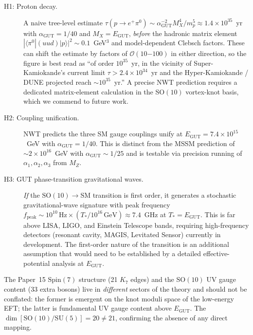 \documentclass[11pt]{article}
\begin{document}
\begin{description}
\item[H1: Proton decay.] A naive tree-level estimate
$\tau(p \to e^+ \pi^0)
\sim \alpha_\text{GUT}^{-2} M_X^4 / m_p^5
\approx 1.4 \times 10^{35}$~yr
with $\alpha_\text{GUT} = 1/40$ and $M_X = E_\text{GUT}$,
\emph{before} the hadronic matrix element
$|\langle \pi^0 | (uud) | p \rangle|^2 \sim 0.1$~GeV$^3$ and
model-dependent Clebsch factors.  These can shift the estimate by
factors of $\mathcal{O}(10\mathrm{-}100)$ in either direction, so
the figure is best read as ``of order $10^{35}$~yr, in the vicinity
of Super-Kamiokande's current limit $\tau > 2.4 \times
10^{34}$~yr and the Hyper-Kamiokande / DUNE projected reach
$\sim 10^{35}$~yr.''  A precise NWT prediction requires a
dedicated matrix-element calculation in the $\mathrm{SO}(10)$
vortex-knot basis, which we commend to future work.

\item[H2: Coupling unification.]
NWT predicts the three SM gauge couplings unify at $E_\text{GUT}
= 7.4 \times 10^{15}$~GeV with $\alpha_\text{GUT} = 1/40$.
This is distinct from the MSSM prediction of $\sim 2 \times
10^{16}$~GeV with $\alpha_\text{GUT} \sim 1/25$ and is testable
via precision running of $\alpha_1, \alpha_2, \alpha_3$ from $M_Z$.

\item[H3: GUT phase-transition gravitational waves.]
\emph{If} the $\mathrm{SO}(10) \to \text{SM}$ transition is first
order, it generates a stochastic gravitational-wave signature with
peak frequency
$f_\text{peak} \sim 10^{10}\,\text{Hz} \times (T_*/10^{16}\,\text{GeV})
\approx 7.4$~GHz
at $T_* = E_\text{GUT}$.  This is far above LISA, LIGO, and
Einstein Telescope bands, requiring high-frequency detectors
(resonant cavity, MAGIS, Levitated Sensor) currently in
development.  The first-order nature of the transition is an
additional assumption that would need to be established by a
detailed effective-potential analysis at $E_\text{GUT}$.
\end{description}

The Paper~15 $\mathrm{Spin}(7)$ structure (21 $K_7$ edges) and the
$\mathrm{SO}(10)$ UV gauge content (33 extra bosons) live in
\emph{different} sectors of the theory and should not be conflated:
the former is emergent on the knot moduli space of the low-energy
EFT; the latter is fundamental UV gauge content above $E_\text{GUT}$.
The $\dim[\mathrm{SO}(10)/\mathrm{SU}(5)] = 20 \neq 21$, confirming
the absence of any direct mapping.
\end{document}
